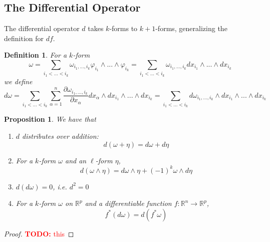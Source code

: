 \documentclass{article}
\newtheorem{definition}{Definition}
\newtheorem{proposition}{Proposition}
\newcommand{\reals}[0]{\mathbb{R}}
\newcommand{\prt}[2]{\frac{\partial #1}{\partial #2}}
\newcommand{\TODO}[1]{\textcolor{red}{\textbf{TODO:} #1}}
\begin{document}
\subsection{The Differential Operator}

The differential operator \(d\) takes \(k\)-forms to \(k + 1\)-forms, generalizing the definition for \(df\).
\begin{definition}
  For a \(k\)-form
  \begin{equation}
    \omega = \sum_{i_1 < ... < i_k}\omega_{i_1,...,i_k}\varphi_{i_1} \wedge ... \wedge \varphi_{i_k} = \sum_{i_1 < ... < i_k}\omega_{i_1,...,i_k}dx_{i_1} \wedge ... \wedge dx_{i_k}
  \end{equation}
  we define
  \begin{equation}
    d\omega = \sum_{i_1 < ... < i_k}\sum_{\alpha = 1}^n\prt{\omega_{i_1,...,i_k}}{x_\alpha} dx_\alpha \wedge dx_{i_1} \wedge ... \wedge dx_{i_k} = \sum_{i_1 < ... < i_k}d\omega_{i_1,...,i_k} \wedge dx_{i_1} \wedge ... \wedge dx_{i_k}
  \end{equation}
\end{definition}
\begin{proposition}
  We have that
  \begin{enumerate}

    \item \(d\) distributes over addition:
    \begin{equation}
      d(\omega + \eta) = d\omega + d\eta
    \end{equation}

    \item For a \(k\)-form \(\omega\) and an \(\ell\)-form \(\eta\),
    \begin{equation}
      d(\omega \wedge \eta) = d\omega \wedge \eta + (-1)^k\omega \wedge d\eta
    \end{equation}

    \item \(d(d\omega) = 0\), i.e. \(d^2 = 0\)

    \item For a \(k\)-form \(\omega\) on \(\reals^p\) and a differentiable function \(f: \reals^n \to \reals^p\),
    \begin{equation}
      f^*(d\omega) = d(f^*\omega)
    \end{equation}

  \end{enumerate}
\end{proposition}
\begin{proof}
  \TODO{this}
\end{proof}
\end{document}
